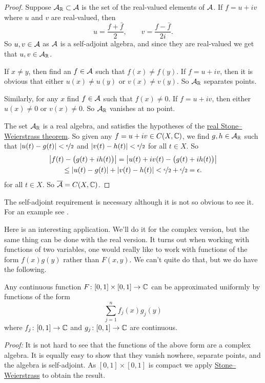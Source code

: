 \begin{proof}
Suppose ${\mathcal{A}}_{\mathbb{R}} \subset {\mathcal{A}}$ is the set of the real-valued elements of
${\mathcal{A}}$.  If $f = u+iv$ where $u$ and $v$ are real-valued, then
\begin{equation*}
u = \frac{f+\bar{f}}{2}, \qquad
v = \frac{f-\bar{f}}{2i} .
\end{equation*}
So $u, v \in {\mathcal{A}}$ as ${\mathcal{A}}$ is a self-adjoint algebra, and since they are
real-valued we get that $u, v \in {\mathcal{A}}_{\mathbb{R}}$.

If $x \not= y$, then find an $f \in {\mathcal{A}}$ such that $f(x) \not= f(y)$.  If $f
= u+iv$, then it is obvious that either $u(x) \not= u(y)$ or $v(x) \not=
v(y)$.  So ${\mathcal{A}}_{\mathbb{R}}$ separates points.

Similarly, for any $x$ find $f \in {\mathcal{A}}$ such that $f(x) \not= 0$.  If $f
= u+iv$, then either $u(x) \not= 0$ or $v(x) \not= 0$.
So ${\mathcal{A}}_{\mathbb{R}}$ vanishes at no point.

The set ${\mathcal{A}}_{\mathbb{R}}$ is a real algebra, and satisfies the hypotheses of the
\hyperref[thm:SWreal]{real Stone--Weierstrass theorem}.  So given any $f = u+iv \in C(X,{\mathbb{C}})$,
we find $g,h \in {\mathcal{A}}_{\mathbb{R}}$ such that
$\lvert {u(t)-g(t)} \rvert < \nicefrac{\epsilon}{2}$ and
$\lvert {v(t)-h(t)} \rvert < \nicefrac{\epsilon}{2}$ for all $t \in X$.  So
\begin{multline*}
\left\lvert {f(t) - \bigl(g(t)+ih(t)\bigr)} \right\rvert = 
\left\lvert {u(t)+iv(t) - \bigl(g(t)+ih(t)\bigr)} \right\rvert \\
\leq
\lvert {u(t)-g(t)} \rvert+\lvert {v(t)-h(t)} \rvert < \nicefrac{\epsilon}{2} +
\nicefrac{\epsilon}{2} = \epsilon.
\end{multline*}
for all $t \in X$.
So $\overline{{\mathcal{A}}} = C(X,{\mathbb{C}})$.
\end{proof}

The self-adjoint requirement is necessary although it is not so obvious to
see it.  For an example see .


Here is an interesting application.  We'll do it for the complex version, but
the same thing can be done with the real version.  It turns out when working
with functions of two variables, one would really like to work with functions
of the form $f(x)g(y)$ rather than $F(x,y)$.  We can't quite do that, but we
do have the following.

\begin{example}
Any continuous function $F \colon [0,1] \times [0,1] \to {\mathbb{C}}$ can be
approximated uniformly by functions of the form
\begin{equation*}
\sum_{j=1}^n f_j(x) g_j(y)
\end{equation*}
where $f_j \colon [0,1] \to {\mathbb{C}}$ and $g_j \colon [0,1] \to {\mathbb{C}}$ are continuous.

\emph{Proof:}
It is not hard to see that the functions of the above form are a complex
algebra.  It is equally easy to show that they vanish nowhere, separate
points, and the algebra is self-adjoint.  As $[0,1] \times [0,1]$ is compact
we apply \hyperref[thm:SWcomplex]{Stone--Weierstrass} to obtain the result.
\end{example}

